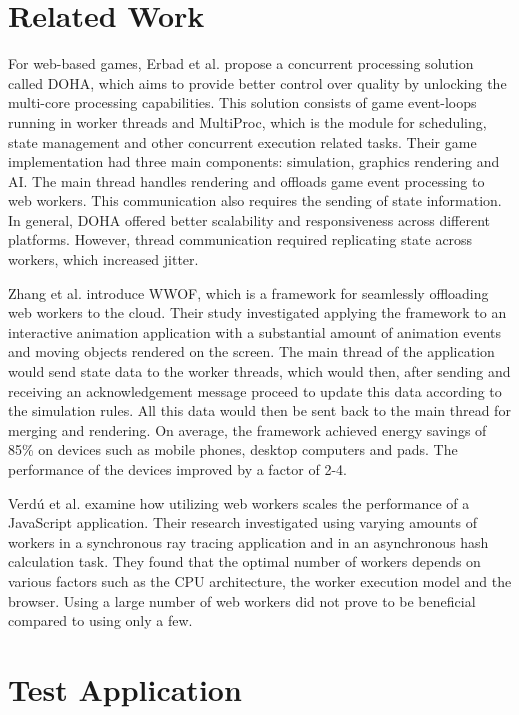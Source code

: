 \documentclass[conference]{IEEEtran}
\begin{document}
\section{Related Work}
\label{sec:soa}

For web-based games, Erbad et al. \cite{doha} propose a concurrent processing solution called DOHA, which aims to provide better control over quality by unlocking the 
multi-core processing capabilities. This solution consists of game event-loops running in worker threads and MultiProc, which is the module for scheduling, state 
management and other concurrent execution related tasks. Their game implementation had three main components: simulation, graphics rendering and AI. The main thread 
handles rendering and offloads game event processing to web workers. This communication also requires the sending of state information. In general, DOHA offered better 
scalability and responsiveness across different platforms. However, thread communication required replicating state across workers, which increased jitter.

Zhang et al. \cite{zhang} introduce WWOF, which is a framework for seamlessly offloading web workers to the cloud. Their study investigated applying the framework to an 
interactive animation application with a substantial amount of animation events and moving objects rendered on the screen. The main thread of the application would send 
state data to the worker threads, which would then, after sending and receiving an acknowledgement message proceed to update this data according to the simulation rules. 
All this data would then be sent back to the main thread for merging and rendering. On average, the framework achieved energy savings of 85\% on devices such as mobile 
phones, desktop computers and pads. The performance of the devices improved by a factor of 2-4.

Verdú et al. \cite{verdu} examine how utilizing web workers scales the performance of a JavaScript application. Their research investigated using varying amounts of 
workers in a synchronous ray tracing application and in an asynchronous hash calculation task. They found that the optimal number of workers depends on various factors 
such as the CPU architecture, the worker execution model and the browser. Using a large number of web workers did not prove to be beneficial compared to using only a few.

\section{Test Application}
\label{sec:implementation}
\end{document}
